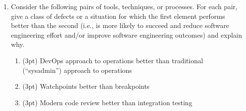 \documentclass{report}
\newif\ifkey
\newcommand{\answerlong}[1]{\ifkey\color{red}\textbf{#1}\color{black}\else\vspace{0.5in}\fi\xspace}
\newcommand*{\pts}[1]{\addtocounter{points}{#1}(#1pt)}
\begin{document}
\begin{spacing}{1.4}
\begin{enumerate}[leftmargin=*]
    \item Consider the following pairs of tools, techniques, or processes. For each pair, give a class of defects or a
situation for which the first element performs better than the second (i.e., is more likely to succeed and reduce software
engineering effort and/or improve software engineering outcomes) and explain why.
\begin{enumerate}
\item \pts{3} DevOps approach to operations better than traditional (``sysadmin'') approach to operations\\
  \answerlong{DevOps is best when the organization developing a service is also running that service, becasue operational pain
    is felt by the same org.}
\item \pts{3} Watchpoints better than breakpoints \\
  \answerlong{Watchpoints are better when you know what value shouldn't be changing, but not where in the code that change is occuring.}
\item \pts{3} Modern code review better than integration testing \\
  \answerlong{The easiest answer is that code review can find code-design defects, but integration testing cannot. Other answers are possible.}
\end{enumerate}


\end{enumerate}
\end{spacing}
\end{document}

